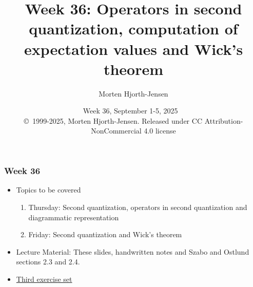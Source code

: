 \documentclass{beamer}
\begin{document}

\newcommand{\exercisesection}[1]{\subsection*{#1}}







\title{Week 36: Operators in second quantization, computation of expectation values and Wick's theorem}


\author{Morten Hjorth-Jensen}

\date{Week 36, September 1-5, 2025
\ \\ 
{\tiny \copyright\ 1999-2025, Morten Hjorth-Jensen. Released under CC Attribution-NonCommercial 4.0 license}
}

\begin{frame}
\titlepage
\end{frame}

\begin{frame}
\frametitle{Week 36}

\begin{itemize}
\item Topics to be covered
\begin{enumerate}

 \item Thursday: Second quantization, operators in second quantization and diagrammatic representation

 \item Friday: Second quantization and Wick's theorem

\end{enumerate}

\noindent
\item Lecture Material: These slides, handwritten notes and	Szabo and Ostlund sections 2.3 and 2.4.

\item \href{{https://github.com/ManyBodyPhysics/FYS4480/blob/master/doc/Exercises/2025/ExercisesWeek36.pdf}}{Third exercise set}
\end{itemize}

\noindent
\end{frame}
\end{document}
